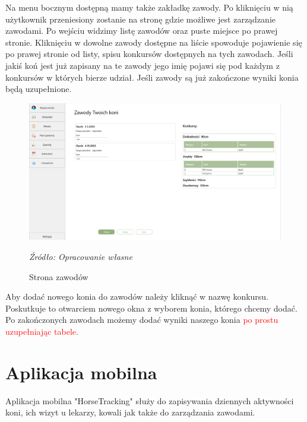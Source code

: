 \documentclass[12pt,oneside]{report}
\begin{document}
Na menu bocznym dostępną mamy także zakładkę zawody. Po kliknięciu w nią użytkownik przeniesiony zostanie na stronę gdzie możliwe jest zarządzanie zawodami. Po wejściu widzimy listę zawodów oraz puste miejsce po prawej stronie. Kliknięciu w dowolne zawody dostępne na liście spowoduje pojawienie się po prawej stronie od listy, spisu konkursów dostępnych na tych zawodach. Jeśli jakiś koń jest już zapisany na te zawody jego imię pojawi się pod każdym z konkursów w których bierze udział. Jeśli zawody są już zakończone wyniki konia będą uzupełnione. 
\begin{figure}[h]
\centering
\includegraphics[scale=0.4]{zawody}
\caption{Strona zawodów}
\textit{Źródło: Opracowanie własne}
\label{StronaZawodow}
\end{figure}
Aby dodać nowego konia do zawodów należy kliknąć w nazwę konkursu. Poskutkuje to otwarciem nowego okna z wyborem konia, którego chcemy dodać. Po zakończonych zawodach możemy dodać wyniki naszego konia \textcolor{red}{po prostu uzupełniając tabele.}
\newpage
\section{Aplikacja mobilna}
Aplikacja mobilna "HorseTracking" służy do zapisywania dziennych aktywności koni, ich wizyt u lekarzy, kowali jak także do zarządzania zawodami.
\end{document}
